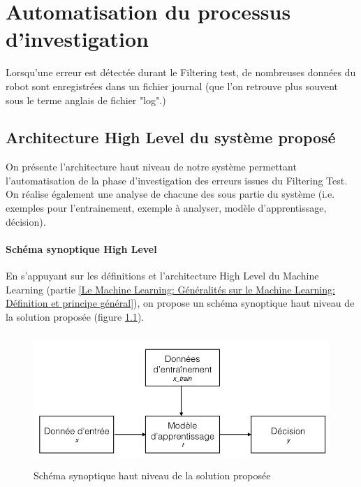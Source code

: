 \chapter{Automatisation du processus d'investigation}
\label{Automatisation du processus d'investigation}
\thispagestyle{fancy}
Lorsqu'une erreur est détectée durant le Filtering test, de nombreuses données du robot sont enregistrées dans un fichier journal (que l'on retrouve plus souvent sous le terme anglais de fichier "log".) 

\section{Architecture High Level du système proposé}
\label{Automatisation du processus d'investigation: Achitecture High Level du système proposé}
On présente l'architecture haut niveau de notre système permettant l'automatisation de la phase d'investigation des erreurs issues du Filtering Test. On réalise également une analyse de chacune des sous partie du système (i.e. exemples pour l'entrainement, exemple à analyser, modèle d'apprentissage, décision).

\subsubsection{Schéma synoptique High Level}
\label{Automatisation du processus d'investigation: Achitecture High Level du système proposé: Schéma synoptique High Level}
En s'appuyant sur les définitions et l'architecture High Level du Machine Learning (partie \ref{Le Machine Learning: Généralités sur le Machine Learning: Définition et principe général}), on propose un schéma synoptique haut niveau de la solution proposée (figure \ref{fig:Schéma synoptique haut niveau de la solution proposée}).

\begin{figure}[h]
	\centering\includegraphics[height=5cm]{images/ML_high_level.jpeg}
	\caption{Schéma synoptique haut niveau de la solution proposée}
	\label{fig:Schéma synoptique haut niveau de la solution proposée}
\end{figure}

